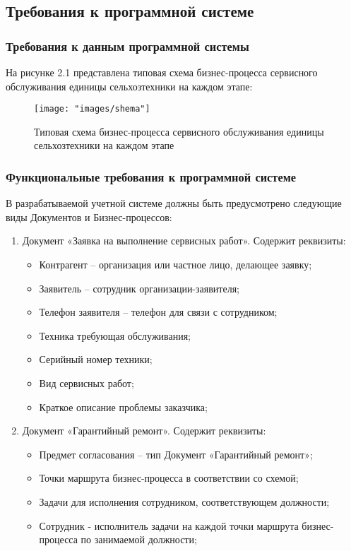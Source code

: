 \subsection{Требования к программной системе}
\subsubsection{Требования к данным программной системы}

На рисунке 2.1 представлена типовая схема бизнес-процесса сервисного обслуживания единицы сельхозтехники на каждом этапе:
\begin{figure}[H]
	\centering
	\texttt{[image: "images/shema"]}
	\caption[Типовая схема бизнес-процесса сервисного обслуживания единицы сельхозтехники на каждом этапе]{Типовая схема бизнес-процесса сервисного обслуживания единицы сельхозтехники на каждом этапе}
	\label{fig:-shema}
\end{figure}

\subsubsection{Функциональные требования к программной системе}

В разрабатываемой учетной системе должны быть предусмотрено следующие виды Документов и Бизнес-процессов:
\begin{enumerate}
	\item Документ «Заявка на выполнение сервисных работ».
	Содержит реквизиты:
		\begin{itemize}
			\item Контрагент – организация или частное лицо, делающее заявку;
			\item Заявитель – сотрудник организации-заявителя;
			\item Телефон заявителя – телефон для связи с сотрудником;
			\item Техника требующая обслуживания;
			\item Серийный номер техники;
			\item Вид сервисных работ;
			\item Краткое описание проблемы заказчика;
		\end{itemize}
		
	\item Документ «Гарантийный ремонт».
	Содержит реквизиты: 
		\begin{itemize}
			\item Предмет согласования – тип Документ «Гарантийный ремонт»;
			\item Точки маршрута бизнес-процесса в соответствии со схемой;
			\item Задачи для исполнения сотрудником, соответствующем должности;
			\item Сотрудник - исполнитель задачи на каждой точки маршрута бизнес-процесса по занимаемой должности;
		\end{itemize}
\end{enumerate}

